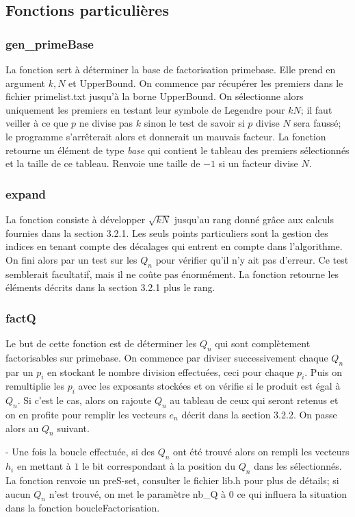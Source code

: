 \documentclass[a4paper]{article} %
\numberwithin{equation}{section}
\begin{document}
\subsection{Fonctions particulières}
\subsubsection{gen\_primeBase}
La fonction sert à déterminer la base de factorisation primebase. Elle prend en argument $k, N$ et UpperBound. On commence par récupérer les premiers dans le fichier primelist.txt jusqu'à la borne UpperBound. On sélectionne alors uniquement les premiers en testant leur symbole de Legendre pour $kN$; il faut veiller à ce que $p$ ne divise pas $k$ sinon le test de savoir si $p$ divise $N$ sera faussé; le programme s'arrêterait alors et donnerait un mauvais facteur. La fonction retourne un élément de type \textit{base} qui contient le tableau des premiers sélectionnés et la taille de ce tableau. Renvoie une taille de $-1$ si un facteur divise $N$.
\subsubsection{expand}
La fonction consiste à développer $\sqrt{kN}$ jusqu'au rang donné grâce aux calculs fournies dans la section 3.2.1. Les seuls points particuliers sont la gestion des indices en tenant compte des décalages qui entrent en compte dans l'algorithme. On fini alors par un test sur les $Q_n$ pour vérifier qu'il n'y ait pas d'erreur. Ce test semblerait facultatif, mais il ne coûte pas énormément. La fonction retourne les éléments décrits dans la section 3.2.1 plus le rang.
\subsubsection{factQ}
Le but de cette fonction est de déterminer les $Q_n$ qui sont complètement factorisables sur primebase. On commence par diviser successivement chaque $Q_n$ par un $p_i$ en stockant le nombre division effectuées, ceci pour chaque $p_i$. Puis on remultiplie les $p_i$ avec les exposants stockées et on vérifie si le produit est égal à $Q_n$. Si c'est le cas, alors on rajoute $Q_n$ au tableau de ceux qui seront retenus et on en profite pour remplir les vecteurs $e_n$ décrit dans la section 3.2.2. On passe alors au $Q_n$ suivant.\par-
Une fois la boucle effectuée, si des $Q_n$ ont été trouvé alors on rempli les vecteurs $h_i$ en mettant à $1$ le bit correspondant à la position du $Q_n$ dans les sélectionnés. La fonction renvoie un preS-set, consulter le fichier lib.h pour plus de détails; si aucun $Q_n$ n'est trouvé, on met le paramètre nb\_Q à $0$ ce qui influera la situation dans la fonction boucleFactorisation.
\end{document}
